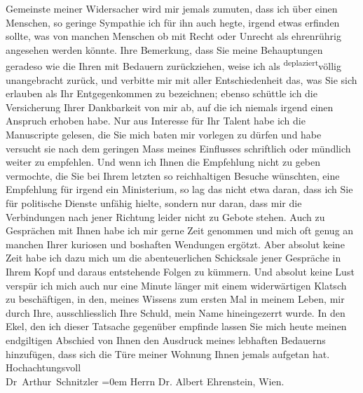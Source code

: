 \begin{ledgroupsized}[t]{13cm}
               Gemeinste meiner Widersacher wird mir jemals zumuten, dass ich über einen Menschen,
               so geringe Sympathie ich für ihn auch hegte, irgend etwas erfinden sollte, was von
               manchen Menschen ob mit Recht oder Unrecht als ehrenrührig angesehen werden könnte.
               Ihre Bemerkung, dass Sie meine Behauptungen geradeso wie die Ihren mit Bedauern
               zurückziehen, weise ich als \substVorne{}\textsuperscript{deplaziert}{\allowbreak}\substDazwischen{}völlig unangebracht\substHinten{} zurück, und verbitte mir mit aller Ent{\pb}schiedenheit
               das, was Sie sich erlauben als Ihr Entgegenkommen zu bezeichnen; ebenso schüttle ich
               die Versicherung Ihrer Dankbarkeit von mir ab, auf die ich niemals irgend einen
               Anspruch erhoben habe. Nur aus Interesse für Ihr Talent habe ich die Manuscripte
               gelesen, die Sie mich baten mir vorlegen zu dürfen und \introOben{}habe\introOben{}
               versucht sie nach dem geringen Mass meines Einflusses schriftlich oder mündlich
               weiter zu empfehlen. Und wenn ich Ihnen die Empfehlung nicht zu geben vermochte, die
               Sie bei Ihrem letzten so reichhaltigen Besuche wünschten, eine Empfehlung für irgend
               ein Ministerium, so lag das nicht etwa daran, dass ich Sie für politische Dienste
                   unfähig hielte, sondern nur daran, dass mir
               die Verbindungen nach jener Richtung leider nicht zu Gebote stehen. Auch zu
               Gesprächen mit Ihnen habe ich mir gerne Zeit genommen und mich oft genug an manchen
               Ihrer kuriosen und boshaften Wendungen ergötzt. Aber absolut keine Zeit habe ich dazu
               mich um die abenteuerlichen Schicksale jener Gespräche in Ihrem Kopf und daraus
               entstehende Fol{\pb}gen zu kümmern. Und absolut keine Lust verspür
               ich mich auch nur eine Minute länger mit einem widerwärtigen Klatsch zu beschäftigen,
               in den, meines Wissens zum ersten Mal in meinem Leben, \introOben{}mir
                  durch\introOben{} Ihre,
               ausschliesslich Ihre Schuld, mein Name hineingezerrt wurde. In den Ekel, den ich
               dieser Tatsache gegenüber empfinde lassen Sie mich heute meinen endgiltigen Abschied
               von Ihnen den Ausdruck meines lebhaften Bedauerns hinzufügen, dass sich die Türe
               meiner Wohnung Ihnen jemals aufgetan hat.\pend
           \pstart
           Hochachtungsvoll{\\[\baselineskip]}\spacefill\mbox{Dr Arthur Schnitzler}\pend
           \leftskip=0em{}\pstart
           \noindent{}Herrn Dr. Albert Ehrenstein, Wien.\pend
           \endnumbering{}\end{ledgroupsized}  \newcommand{\dateiname}{L02019}\newcommand{\titel}{Arthur Schnitzler an Albert Ehrenstein, 6. 5. 1911}\newcommand{\editorInnen}{Martin Anton Müller und Gerd-Hermann Susen}
      